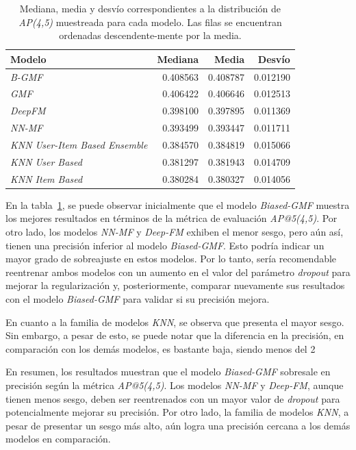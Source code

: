 \documentclass[11pt,a4paper,twoside]{thesis}
\begin{document}
\begin{table}[!htb]
	\centering
	\footnotesize
	\begin{tabular}{lrrr}
		\hline
		Modelo                                & Mediana  & Media    & Desvío   \\
		\hline
		\textit{B-GMF}                        & 0.408563 & 0.408787 & 0.012190 \\
		\textit{GMF}                          & 0.406422 & 0.406646 & 0.012513 \\
		\textit{DeepFM}                       & 0.398100 & 0.397895 & 0.011369 \\
		\textit{NN-MF}                        & 0.393499 & 0.393447 & 0.011711 \\
		\textit{KNN User-Item Based Ensemble} & 0.384570 & 0.384819 & 0.015066 \\
		\textit{KNN User Based}               & 0.381297 & 0.381943 & 0.014709 \\
		\textit{KNN Item Based}               & 0.380284 & 0.380327 & 0.014056 \\
		\hline
	\end{tabular}
	\caption{
		Mediana, media y desvío correspondientes a la distribución de
		\textit{AP(4,5)} muestreada para cada modelo. Las filas se encuentran ordenadas descendente-mente por la media.
	}
	\label{table:ap_at_k}
\end{table}

En la tabla~\ref{table:ap_at_k}, se puede observar inicialmente que el modelo
\textit{Biased-GMF} muestra los mejores resultados en términos de la métrica de
evaluación \textit{AP@5(4,5)}. Por otro lado, los modelos \textit{NN-MF} y
\textit{Deep-FM} exhiben el menor sesgo, pero aún así, tienen una precisión
inferior al modelo \textit{Biased-GMF}. Esto podría indicar un mayor grado de
sobreajuste en estos modelos. Por lo tanto, sería recomendable reentrenar ambos
modelos con un aumento en el valor del parámetro \textit{dropout} para mejorar
la regularización y, posteriormente, comparar nuevamente sus resultados con el
modelo \textit{Biased-GMF} para validar si su precisión mejora.

En cuanto a la familia de modelos \textit{KNN}, se observa que presenta el
mayor sesgo. Sin embargo, a pesar de esto, se puede notar que la diferencia en
la precisión, en comparación con los demás modelos, es bastante baja, siendo
menos del 2%

En resumen, los resultados muestran que el modelo \textit{Biased-GMF} sobresale
en precisión según la métrica \textit{AP@5(4,5)}. Los modelos \textit{NN-MF} y
\textit{Deep-FM}, aunque tienen menos sesgo, deben ser reentrenados con un
mayor valor de \textit{dropout} para potencialmente mejorar su precisión. Por
otro lado, la familia de modelos \textit{KNN}, a pesar de presentar un sesgo
más alto, aún logra una precisión cercana a los demás modelos en comparación.
\clearpage
\end{document}
